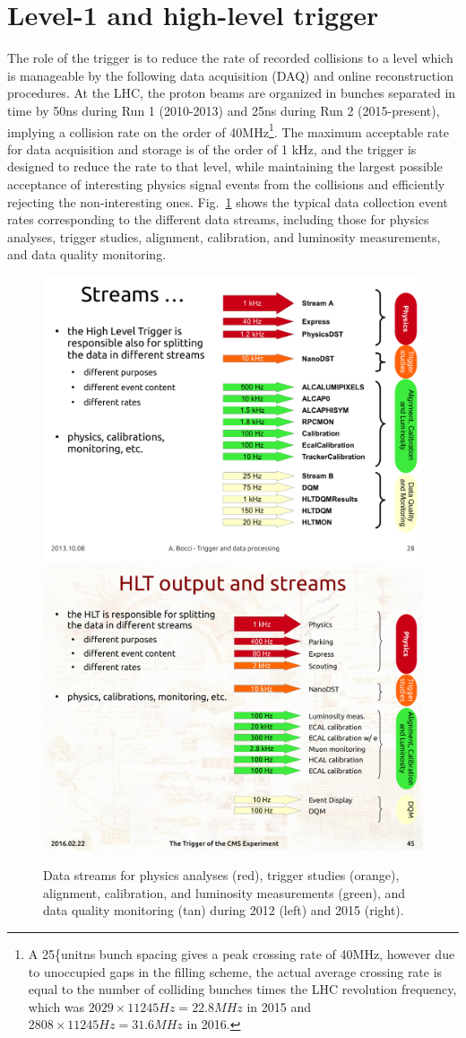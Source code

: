 \section {Level-1 and high-level trigger}
\label{sec:trigger}

The role of the trigger is to reduce the rate of recorded collisions to
a level which is manageable by the following data acquisition (DAQ)
and online reconstruction procedures. At the LHC, the proton beams are organized in
bunches separated in time by 50\unit{ns} during Run 1 (2010-2013) and 25\unit{ns}
during Run 2 (2015-present), implying a collision rate on the order of
40\unit{MHz}\footnote{A 25\{unit{ns} bunch spacing gives a peak
  crossing rate of 40\unit{MHz}, however due to unoccupied gaps in the filling
  scheme, the actual average crossing rate is equal to the number of
  colliding bunches times the LHC revolution frequency, which was
  $2029\times 11245\unit{Hz} = 22.8\unit{MHz}$ in 2015 and $2808 \times 11245\unit{Hz} = 31.6
  \unit{MHz}$ in 2016.}.
The maximum acceptable rate for data acquisition and storage is of the order of 1 \unit{kHz}, and
the trigger is designed to reduce the rate to that level, while
maintaining the largest possible acceptance of interesting physics signal
events from the collisions and efficiently rejecting the
non-interesting ones. Fig.~\ref{fig:streams} shows the typical
data collection event rates corresponding to the different data
streams, including those for physics analyses, trigger studies, alignment, calibration, and
luminosity measurements, and data quality monitoring. 

\begin{figure}\centering
\includegraphics[width=.45\textwidth]{figs/cms/Streams2012.pdf}
\includegraphics[width=.45\textwidth]{figs/cms/Streams2015.pdf}
\caption{Data streams for physics analyses (red), trigger studies (orange), alignment, calibration, and
luminosity measurements (green), and data quality monitoring (tan) during 2012 (left) and 2015 (right).  
\label{fig:streams}}
\end{figure}

